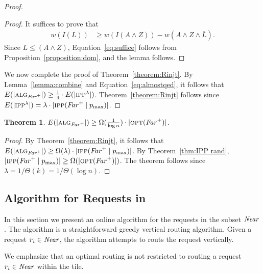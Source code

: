 \documentclass[11pt]{article}
\newtheorem{theorem}{Theorem}
\newcommand{\route}{\text{\sc{ipp}}}
\newcommand{\IPP}{\route}
\newcommand{\opt}{\text{\textsc{opt}}}
\newcommand{\pmax}{p_{\max}}
\newcommand{\alg}{\text{\sc{alg}}}
\newenvironment{proof sketch}[1]{\noindent {\emph{Proof sketch of #1:}}}{\hfill \qed}
\newcommand{\far}{\text{\emph{Far}}}
\newcommand{\near}{\text{\emph{Near}}}
\newcommand{\algf}{\alg_{\far^+}}
\newcommand{\RIPP}{\IPP(\far^+ \mid \pmax)}\newcommand{\RIPPt}{\IPP^{\lambda}}
\newcommand{\algfar}{\algf}
\begin{document}
\begin{proof}
\begin{proof}
It suffices to prove that
\begin{align}
  \label{eq:suffice}
  w(I(L))&\geq w(I(A\wedge Z))-w(A\wedge Z \wedge \bar{L}).
\end{align}
Since $L \leq (A \wedge Z)$, Equation~\eqref{eq:suffice} follows from Proposition~\ref{proposition:dom}, and the
lemma follows.
\end{proof}

We now complete the proof of Theorem~\ref{theorem:Rinjt}. By
Lemma~\ref{lemma:combine} and Equation~\eqref{eq:almostqed}, it follows that
$E(|\algfar|)\geq \frac 14 \cdot E(|\RIPPt|)$. Theorem~\ref{theorem:Rinjt}
follows since $E(|\RIPPt|)= \lambda \cdot |\RIPP|$.
\end{proof}


\begin{theorem}\label{thm:far}
  $E(|\algf|) \geq \Omega( \frac{1}{\log n})\cdot |\opt (\far^+)|$.
  \end{theorem}
  \begin{proof}
 By Theorem~\ref{theorem:Rinjt}, it follows that
    $E(|\algf|) \geq \Omega(\lambda) \cdot |\RIPP|$. By
    Theorem~\ref{thm:IPP rand}, $|\RIPP|\geq
    \Omega(|\opt(\far^+)|)$. The theorem follows since $\lambda=1/\Theta(k)=1/\Theta(\log
    n)$.
  \end{proof}
\subsection{Algorithm for Requests in \near}\label{sec:near}
In this section we present an online algorithm for the requests in the
subset $\near$.  The algorithm is a straightforward greedy vertical
routing algorithm.
Given a request $r_i\in \near$, the algorithm
attempts to routs the request vertically.

\begin{comment}
Upon arrival of a request $r_i\in \near$, the computation of the path
for $r_i$ proceeds as follows:
\begin{enumerate}
    \item Let $t=t_i$.
    \item While the vertical path from $(a_i,t)$ to $(b_i,t)$ is saturated:
    \begin{enumerate}
        \item If the horizontal edge is not saturated move to the right (i.e, $t\gets t+1$).
        \item Else, if the horizontal edge saturated then \textbf{reject}.
        \item If $(a_i,t)$ is outside the tile, then \textbf{reject} $r_i$.
    \end{enumerate}
    \item If a nonsaturated vertical path is found, then the path consists of the
        concatenation of the horizontal path from $(a_i,t_i)$ to $(a_i,t)$ and
        the vertical path from $(a_i,t)$ to $(b_i,t)$.
\end{enumerate}
\end{comment}
We emphasize that an optimal routing is not restricted to routing a
request $r_i\in \near$ within the tile.
\end{document}
